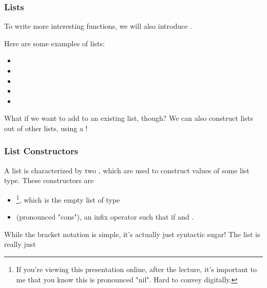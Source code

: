 \documentclass[aspectratio=169, handout]{beamer}
\begin{document}
\begin{frame}[fragile]
  \frametitle{Lists}

  To write more interesting functions, we will also introduce .

  \pause
  \vspace{\fill}


  \pause
  \vspace{\fill}

  Here are some examples of lists:
  \begin{itemize}
    \item {}
    \item {}
    \item {}
    \item {}
    \item {}
  \end{itemize}

  \pause
  \vspace{\fill}

  What if we want to add to an existing list, though? We can also construct lists out of other lists, using a !
\end{frame}

\begin{frame}[fragile]
  \frametitle{List Constructors}

  A list is characterized by two , which are used to construct
  values of some list type. These constructors are
  \pause
  \begin{itemize}
    \item \code{[]}\footnote{
      If you're viewing this presentation online, after the lecture, it's
      important to me that you know this is pronounced "nil". Hard to convey digitally.
    }, which is the empty list of type  \pause
    \item \code{::} (pronounced "cons"), an infix operator such that
     if  and .
  \end{itemize}

  \pause
  \vspace{\fill}

  While the bracket notation is simple, it's actually just syntactic sugar! The
  list \code{[1, 2, 3]} is really just 

  \pause
  \vspace{\fill}


  \tgs
\end{frame}
\end{document}
